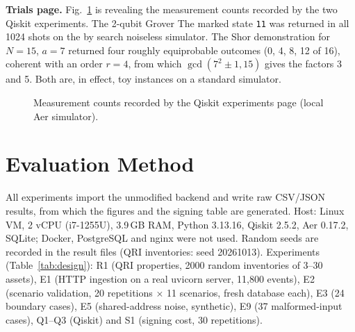 \documentclass[conference]{IEEEtran}
\newcommand{\code}[1]{\texttt{#1}}
\begin{document}
\textbf{Trials page.} Fig.~\ref{fig:qiskit} is revealing the measurement counts recorded by the two Qiskit experiments. The 2-qubit Grover The marked state \code{11} was returned in all 1024 shots on the by search noiseless simulator. The Shor demonstration for $N=15$, $a=7$ returned four roughly equiprobable outcomes (0, 4, 8, 12 of 16), coherent with an order $r=4$, from which $\gcd(7^2\pm 1, 15)$ gives the factors 3 and 5. Both are, in effect, toy instances on a standard simulator.

\begin{figure}[t]
\centering
{}
\caption{Measurement counts recorded by the Qiskit experiments page (local Aer simulator).}
\label{fig:qiskit}
\end{figure}

\section{Evaluation Method}\label{sec:method}
All experiments import the unmodified backend and write raw CSV/JSON results, from which the figures and the signing table are generated. Host: Linux VM, 2 vCPU (i7-1255U), 3.9\,GB RAM, Python 3.13.16, Qiskit 2.5.2, Aer 0.17.2, SQLite; Docker, PostgreSQL and nginx were not used. Random seeds are recorded in the result files (QRI inventories: seed 20261013). Experiments (Table~\ref{tab:design}): R1 (QRI properties, 2000 random inventories of 3--30 assets), E1 (HTTP ingestion on a real uvicorn server, 11,800 events), E2 (scenario validation, 20 repetitions $\times$ 11 scenarios, fresh database each), E3 (24 boundary cases), E5 (shared-address noise, synthetic), E9 (37 malformed-input cases), Q1--Q3 (Qiskit) and S1 (signing cost, 30 repetitions).
\end{document}
